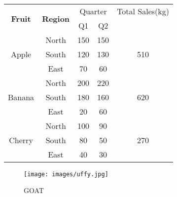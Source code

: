 \documentclass{report}
\begin{document}
\begin{center}
    \begin{tabular}{|c|c|c|c|c|}
    \hline
        \multirow{2}{*}{\textbf{Fruit}} & \multirow{2}{*}{\textbf{Region}} & \multicolumn{2}{|c|}{Quarter} & Total Sales(kg) \\
        \cline{3-4}
         & & Q1 & Q2 & \\
         \hline
         \multirow{3}{*}{Apple} & North & 150 & 150 & \multirow{3}{*}{510} \\
         \cline{2-4}
         & South & 120 & 130 & \\
         \cline{2-4}
         & East & 70 & 60 & \\
         \hline
         \multirow{3}{*}{Banana} & North & 200 & 220 & \multirow{3}{*}{620} \\
         \cline{2-4}
         & South & 180 & 160 & \\
         \cline{2-4}
         & East & 20 & 60 & \\
         \hline
         \multirow{3}{*}{Cherry} & North & 100 & 90 & \multirow{3}{*}{270} \\
         \cline{2-4}
         & South & 80 & 50 & \\
         \cline{2-4}
         & East & 40 & 30 & \\
         \hline
    \end{tabular}
\end{center}
\begin{figure}
    \centering
    \texttt{[image: images/uffy.jpg]}
    \caption{GOAT}
    \label{fig:enter-label}
\end{figure}
\end{document}
